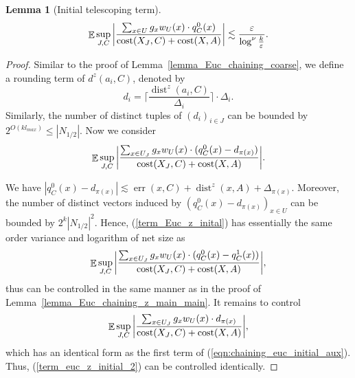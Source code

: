 \documentclass[11pt,letterpaper]{article}
\newtheorem{lemma}[theorem]{Lemma}
\theoremstyle{definition}
\newcommand{\eps}{\varepsilon}
\DeclareMathOperator*{\E}{\ensuremath{\mathbb{E}}}
\DeclareMathOperator{\dist}{dist}
\begin{document}
\begin{lemma}[Initial telescoping term] \label{lemma_Euc_chaining_z_coarse}
\begin{eqnarray*}
\E\sup_{J,C}\bigg|\frac{\sum_{x\in U} g_x w_U(x)\cdot q_C^0(x)}{\cost(X_J,C)+\cost(X,A)}\bigg|\lesssim \frac{\eps}{\log^\nu \frac{k}{\eps}}.
\end{eqnarray*}
\end{lemma}

\begin{proof}
Similar to the proof of Lemma~\ref{lemma_Euc_chaining_coarse}, we define a rounding term of $d^z(a_i,C)$, denoted by
\[
d_i = \big\lceil \frac{\dist^z(a_i,C)}{\Delta_i} \big\rceil\cdot \Delta_i.
\]
Similarly, the number of distinct tuples of $(d_i)_{i\in J}$ can be bounded by $2^{O(kl_{max})}\leq |N_{1/2}|$. Now we consider
\begin{equation}\label{term_Euc_z_inital}
\E\sup_{J,C}\bigg|\frac{\sum_{x\in U_J} g_x w_U(x)\cdot (q_C^0(x)-d_{\pi(x)})}{\cost(X_J,C)+\cost(X,A)}\bigg|.
\end{equation}

We have $|q_C^0(x) - d_{\pi(x)}|\lesssim \operatorname{err}(x,C) + \dist^z(x,A) + \Delta_{\pi(x)}$. Moreover, the number of distinct vectors induced by $(q_C^0(x)-d_{\pi(x)})_{x\in U}$ can be bounded by $2^k|N_{1/2}|^2$. Hence, (\ref{term_Euc_z_inital}) has essentially the same order variance and logarithm of net size as
$$
\E\sup_{J,C}\bigg|\frac{\sum_{x\in U_J} g_x w_U(x)\cdot (q_C^0(x)-q_C^1(x))}{\cost(X_J,C)+\cost(X,A)}\bigg|,
$$
thus can be controlled in the same manner as in the proof of Lemma~\ref{lemma_Euc_chaining_z_main_main}. 
It remains to control 
\begin{equation}\label{term_euc_z_initial_2}
\E\sup_{J,C}\bigg|\frac{\sum_{x\in U_J} g_x w_U(x)\cdot d_{\pi(x)}}{\cost(X_J,C)+\cost(X,A)}\bigg|,
\end{equation} 
which has an identical form as the first term of (\ref{eqn:chaining_euc_initial_aux}). Thus, (\ref{term_euc_z_initial_2}) can be controlled identically.
\end{proof}%
\end{document}

